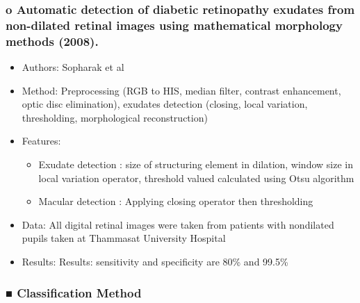 \documentclass[12pt]{report}
\begin{document}
\subsubsection{o	Automatic detection of diabetic retinopathy exudates from non-dilated retinal images using mathematical morphology methods (2008). \cite{sopharak2008automatic}}
\begin{itemize}
\item Authors: Sopharak et al
\item Method: Preprocessing (RGB to HIS, median filter, contrast enhancement, optic disc elimination), exudates detection (closing, local variation, thresholding, morphological reconstruction)
\item Features:
\begin{itemize}
\item Exudate detection : size of structuring element in dilation, window size in local variation operator, threshold valued calculated using Otsu algorithm
\item Macular detection : Applying closing operator then thresholding
\end{itemize}
\item Data: All digital retinal images were taken from patients with nondilated pupils taken at Thammasat University Hospital
\item Results: Results: sensitivity and specificity are 80\% and 99.5\%
\end{itemize}

\subsubsection{■ Classification Method}
\end{document}

